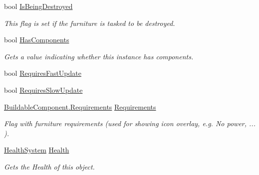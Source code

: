 \begin{DoxyCompactItemize}
bool \hyperlink{class_furniture_a4faff1043382e7b48824a2a16eb15712}{Is\+Being\+Destroyed}
\begin{DoxyCompactList}\small\item\em This flag is set if the furniture is tasked to be destroyed. \end{DoxyCompactList}\item 
bool \hyperlink{class_furniture_ac105738f22c551e0420de3efa348c6d2}{Has\+Components}
\begin{DoxyCompactList}\small\item\em Gets a value indicating whether this instance has components. \end{DoxyCompactList}\item 
bool \hyperlink{class_furniture_a4ae33e19e8b9e821bd39baca75687699}{Requires\+Fast\+Update}
\item 
bool \hyperlink{class_furniture_ab830f3c4829513c868040619575f0b7e}{Requires\+Slow\+Update}
\item 
\hyperlink{class_project_porcupine_1_1_buildable_1_1_components_1_1_buildable_component_a331a0d67512b8b402c04c8cf31c0ca8a}{Buildable\+Component.\+Requirements} \hyperlink{class_furniture_a9c624d4c2cc252ae4cec2dc36d585953}{Requirements}
\begin{DoxyCompactList}\small\item\em Flag with furniture requirements (used for showing icon overlay, e.\+g. No power, ... ). \end{DoxyCompactList}\item 
\hyperlink{class_health_system}{Health\+System} \hyperlink{class_furniture_aa3ed4de73a436f888ac9689a8f2fab0d}{Health}
\begin{DoxyCompactList}\small\item\em Gets the Health of this object. \end{DoxyCompactList}\end{DoxyCompactItemize}
